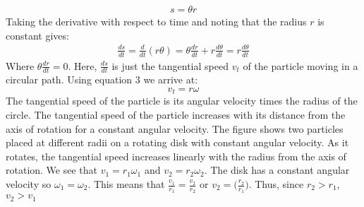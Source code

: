 \documentclass[a4paper]{article}
\newcommand\der[2]{\frac{d #1}{d #2}}
\def\centerarc[#1](#2)(#3:#4:#5){\draw[#1] ($(#2)+({#5*cos(#3)},{#5*sin(#3)})$) arc (#3:#4:#5)}
\begin{document}
\begin{align*}
    s = \theta r
\end{align*}
\newpage
\noindent Taking the derivative with respect to time and noting that the radius $r$ is constant gives:
\begin{align*}
    \der{s}{t} = \der{}{t}(r\theta) = \theta\der{r}{t} + r\der{\theta}{t} = r\der{\theta}{t}
\end{align*}
Where $\theta\der{r}{t} = 0$. Here, $\der{s}{t}$ is just the tangential speed $v_t$ of the particle moving in a circular path. Using equation 3 we arrive at:
\begin{equation}
    v_t = r\omega
\end{equation}
The tangential speed of the particle is its angular velocity times the radius of the circle. The tangential speed of the particle increases with its distance from the axis of rotation for a constant angular velocity. The figure shows two particles placed at different radii on a rotating disk with constant angular velocity. As it rotates, the tangential speed increases linearly with the radius from the axis of rotation. We see that $v_1 = r_1\omega_1$ and $v_2 = r_2\omega_2$. The disk has a constant angular velocity so $\omega_1 = \omega_2$. This means that $\frac{v_1}{r_1} = \frac{v_2}{r_2}$ or $v_2 = \big(\frac{r_2}{r_1}\big)$. Thus, since $r_2 > r_1$, $v_2 > v_1$
\begin{center}
\end{center}
\end{document}

